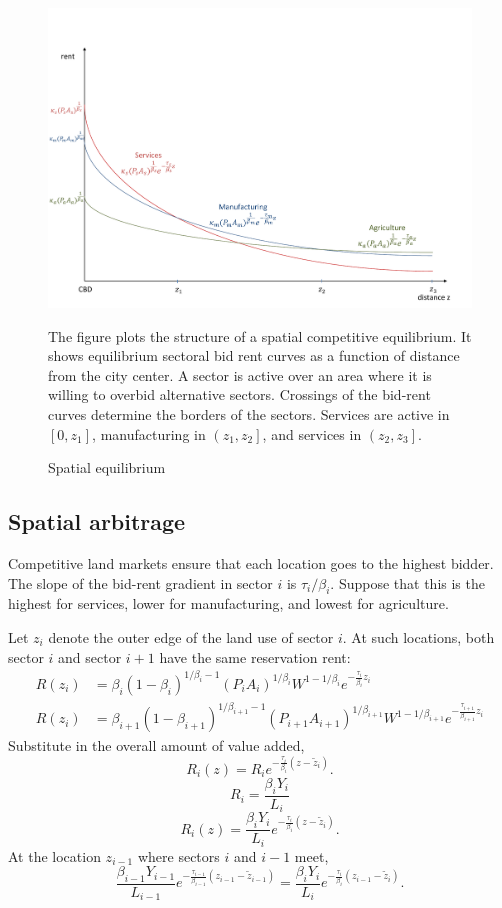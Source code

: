 \documentclass[12pt]{article}
\begin{document}
\begin{figure}[h!]
\label{fig:BidRent}
\caption{Spatial equilibrium}
\begin{center}
\includegraphics[scale=0.6]{figures/fig_spatial_equilibrium}
\end{center}

\noindent \footnotesize{The figure plots the structure of a spatial competitive equilibrium. It shows equilibrium sectoral bid rent curves as a function of distance from the city center. A sector is active over an area where it is willing to overbid alternative sectors. Crossings of the bid-rent curves determine the borders of the sectors. Services are active in $[0,z_1]$, manufacturing in $\left(z_1,z_2\right]$, and services in $\left(z_2,z_3\right]$.}
\end{figure}


\subsection{Spatial arbitrage}
Competitive land markets ensure that each location goes to the highest bidder. The slope of the bid-rent gradient in sector $i$ is $\tau_i/\beta_i$. Suppose that this is the highest for services, lower for manufacturing, and lowest for agriculture.

Let $z_i$ denote the outer edge of the land use of sector $i$. At such locations, both sector $i$ and sector $i+1$ have the same reservation rent:
\begin{align}\label{eq:BorderRents}
R(z_i) &=\beta_i(1-\beta_i)^{1/\beta_i-1} (P_iA_i)^{1/\beta_i} W^{1-1/\beta_i} e^{-\frac{\tau_i}{\beta_i} z_i}\\
R(z_i) &=\beta_{i+1}(1-\beta_{i+1})^{1/\beta_{i+1}-1} (P_{i+1}A_{i+1})^{1/\beta_{i+1}} W^{1-1/\beta_{i+1}} e^{-\frac{\tau_{i+1}}{\beta_{i+1}} z_i}
\end{align}
Substitute in the overall amount of value added,
\[
R_i(z) = R_i e^{-\frac{\tau_i}{\beta_i}(z-\tilde z_i)}.
\]
\[
R_i = \frac{\beta_i Y_i}{L_i}
\]
\[
R_i(z) = \frac{\beta_i Y_i}{L_i} e^{-\frac{\tau_i}{\beta_i}(z-\tilde z_i)}.
\]
At the location $z_{i-1}$ where sectors $i$ and $i-1$ meet,
\[
\frac{\beta_{i-1} Y_{i-1}}{L_{i-1}}
  e^{-\frac{\tau_{i-1}}{\beta_{i-1}}(z_{i-1}-\tilde z_{i-1})} =
\frac{\beta_i Y_i}{L_i}
  e^{-\frac{\tau_i}{\beta_i}(z_{i-1} -\tilde z_i)}.
\]
\end{document}
